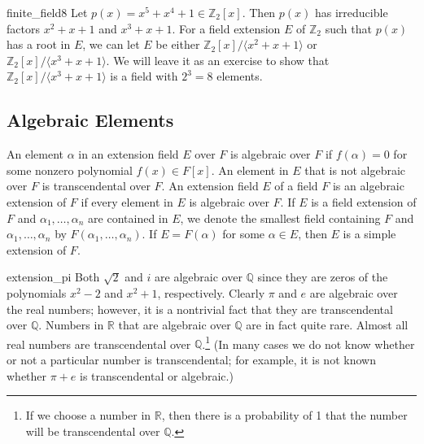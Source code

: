 \begin{example}{finite_field8}
Let $p(x) = x^5 + x^4 + 1 \in {\mathbb Z}_2[x]$. Then $p(x)$ has irreducible
factors $x^2 + x + 1$ and $x^3 + x + 1$. For a field extension $E$ of
${\mathbb Z}_2$ such that $p(x)$ has a root in $E$, we can let $E$
be either ${\mathbb Z}_2[x] / \langle x^2 + x + 1 \rangle$ or ${\mathbb Z}_2[x] /
\langle x^3 + x + 1 \rangle$.  We will leave it as an exercise to
show that ${\mathbb Z}_2[x] / \langle x^3 + x + 1 \rangle$ is a field
with $2^3=8$ elements. 
\end{example}


 
\subsection*{Algebraic Elements}
 

An element $\alpha$ in an extension field $E$ over $F$ is {\bfi
algebraic\/} over $F$ if $f(\alpha)=0$ for some nonzero polynomial $f(x)
\in F[x]$. An element in $E$ that is not algebraic over $F$ is {\bfi
transcendental\/}
over $F$. An extension field $E$ of a field $F$ is an {\bfi algebraic 
extension\/} of
$F$ if every element in $E$ is algebraic over $F$. If $E$ is a field
extension of $F$ and $\alpha_1, \ldots, \alpha_n$ are contained in
$E$, we denote the smallest field containing $F$ and $\alpha_1,
\ldots, \alpha_n$ by $F( \alpha_1, \ldots,
\alpha_n)$\label{notefieldcont}. If $E = F(
\alpha )$ for some $\alpha \in E$, then $E$ is a {\bfi simple
extension\/} of $F$.  


\begin{example}{extension_pi}
Both $\sqrt{2}$ and $i$ are algebraic over ${\mathbb Q}$ since they are
zeros of the polynomials $x^2 -2$ and $x^2 + 1$, respectively. Clearly
$\pi$ and $e$ are algebraic over the real numbers; however, it is a
nontrivial fact that they are transcendental over ${\mathbb Q}$. Numbers
in ${\mathbb R}$ that are algebraic over ${\mathbb Q}$ are in fact quite
rare. Almost all real numbers are transcendental over ${\mathbb
Q}$.\footnote{If we choose a number in ${\mathbb R}$, then there is a
probability of 1 that the number will be transcendental over ${\mathbb
Q}$.}  
(In many cases we do not know whether or not a particular number is 
transcendental; for example, it is not known whether $\pi + e$ is
transcendental or algebraic.)  
\hspace*{1in}
\end{example}
 
